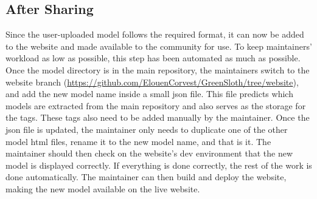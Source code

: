 \subsection{After Sharing}

Since the user-uploaded model follows the required format, it can now be added to the website and made available to the community for use. To keep maintainers' workload as low as possible, this step has been automated as much as possible. Once the model directory is in the main \greensloth{} repository, the maintainers switch to the website branch (\url{https://github.com/ElouenCorvest/GreenSloth/tree/website}), and add the new model name inside a small \gls{json} file. This file predicts which models are extracted from the main repository and also serves as the storage for the tags. These tags also need to be added manually by the maintainer. Once the \gls{json} file is updated, the maintainer only needs to duplicate one of the other model \gls{html} files, rename it to the new model name, and that is it. The maintainer should then check on the website's dev environment that the new model is displayed correctly. If everything is done correctly, the rest of the work is done automatically. The maintainer can then build and deploy the website, making the new model available on the live website.